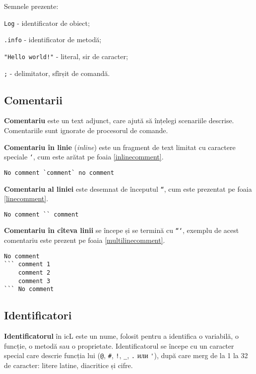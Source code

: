 Semnele prezente:
\begin{icItems}
\item
	\lstinline|Log| - identificator de obiect;
\item
	\lstinline|.info| - identificator de metodă;
\item
	\lstinline|"Hello world!"| - literal, sir de caracter;
\item
	\lstinline|;| - delimitator, sfîrșit de comandă.
\end{icItems}

\subsection{Comentarii}

\textbf{Comentariu} este un text adjunct, care ajută să înțelegi scenariile descrise. Comentariile sunt ignorate de procesorul de comande.

\textbf{Comentariu în linie} (\textit{inline}) este un fragment de text limitat cu caractere speciale \texttt{`}, cum este arătat pe foaia \ref{inlinecomment}.

\begin{lstlisting}[caption=Comentariu în linie,label=inlinecomment]
No comment `comment` no comment
\end{lstlisting}

\textbf{Comentariu al liniei} este desemnat de începutul \texttt{``}, cum este prezentat pe foaia \ref{linecomment}.

\begin{lstlisting}[caption=Comentariu al liniei,label=linecomment]
No comment `` comment
\end{lstlisting}

\textbf{Comentariu în cîteva linii} se începe și se termină cu \texttt{```}, exemplu de acest comentariu este prezent pe foaia \ref{multilinecomment}.

\begin{lstlisting}[caption=Comentariu în cîteva linii,label=multilinecomment]
No comment
``` comment 1
	comment 2
	comment 3
``` No comment
\end{lstlisting}

\subsection{Identificatori}

\textbf{Identificatorul} în icL este un nume, folosit pentru a identifica o variabilă, o funcție, o metodă sau o proprietate. Identificatorul se începe cu un caracter special care descrie funcția lui (\lstinline|@|, \lstinline|#|, \lstinline|!|, \lstinline|_|, \lstinline|.| или \lstinline|'|), după care merg de la 1 la 32 de caracter: litere latine, diacritice și cifre.

